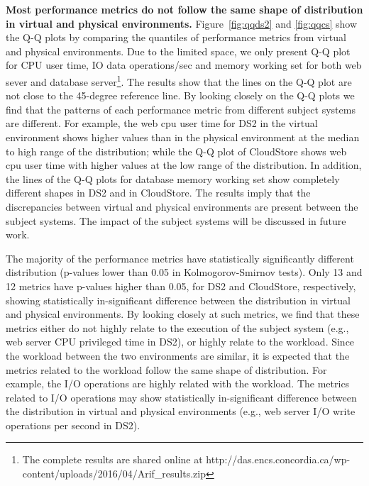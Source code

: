 \textbf{Most performance metrics do not follow the same shape of distribution in virtual and physical environments.} Figure~\ref{fig:qqds2} and \ref{fig:qqcs} show the Q-Q plots by comparing the quantiles of performance metrics from virtual and physical environments. Due to the limited space, we only present Q-Q plot for CPU user time, IO data operations/sec and memory working set for both web sever and database server\footnote{The complete results are shared online at http://das.encs.concordia.ca/wp-content/uploads/2016/04/Arif\_results.zip}. The results show that the lines on the Q-Q plot are not close to the 45-degree reference line. By looking closely on the Q-Q plots we find that the patterns of each performance metric from different subject systems are different. For example, the web cpu user time for DS2 in the virtual environment shows higher values than in the physical environment at the median to high range of the distribution; while the Q-Q plot of CloudStore shows web cpu user time with higher values at the low range of the distribution. In addition, the lines of the Q-Q plots for database memory working set show completely different shapes in DS2 and in CloudStore. The results imply that the discrepancies between virtual and physical environments are present between the subject systems. The impact of the subject systems will be discussed in future work.

The majority of the performance metrics have statistically significantly different distribution (p-values lower than 0.05 in Kolmogorov-Smirnov tests). Only 13 and 12 metrics have p-values higher than 0.05, for DS2 and CloudStore, respectively, showing statistically in-significant difference between the distribution in virtual and physical environments. By looking closely at such metrics, we find that these metrics either do not highly relate to the execution of the subject system (e.g., web server CPU privileged time in DS2), or highly relate to the workload. Since the workload between the two environments are similar, it is expected that the metrics related to the workload follow the same shape of distribution. For example, the I/O operations are highly related with the workload. The metrics related to I/O operations may show statistically in-significant difference between the distribution in virtual and physical environments (e.g., web server I/O write operations per second in DS2). %


